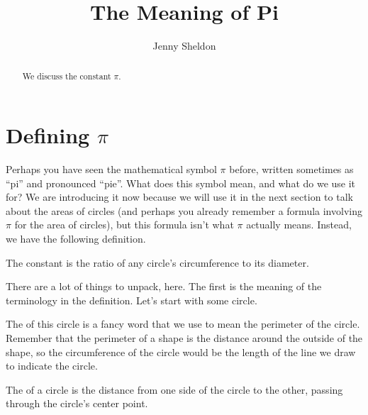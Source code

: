 \documentclass{ximera}
\title{The Meaning of Pi}
\author{Jenny Sheldon}
\begin{document}
\begin{abstract}
We discuss the constant $\pi$.
\end{abstract}
\maketitle

\section{Defining $\pi$}

Perhaps you have seen the mathematical symbol $\pi$ before, written sometimes as ``pi'' and pronounced ``pie''. What does this symbol mean, and what do we use it for? We are introducing it now because we will use it in the next section to talk about the areas of circles (and perhaps you already remember a formula involving $\pi$ for the area of circles), but this formula isn't what $\pi$ actually means. Instead, we have the following definition.

\begin{definition}
The constant \dfn{$\pi$} is the ratio of any circle's circumference to its diameter.
\end{definition}

There are a lot of things to unpack, here. The first is the meaning of the terminology in the definition. Let's start with some circle.
\begin{center}
\end{center}
The  of this circle is a fancy word that we use to mean the perimeter of the circle. Remember that the perimeter of a shape is the distance around the outside of the shape, so the circumference of the circle would be the length of the line we draw to indicate the circle.

The  of a circle is the distance from one side of the circle to the other, passing through the circle's center point.
\begin{center}
\end{center}
\end{document}
